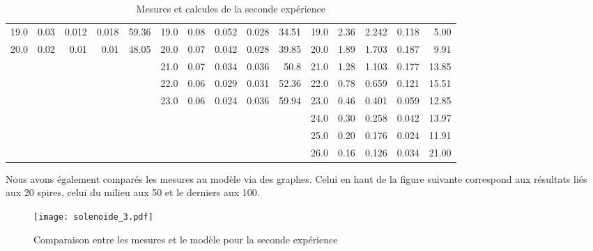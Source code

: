 \begin{table}[H]
{\begin{tabular}{rrrrrrrrrrrrrrr}
   19.0 &  0.03 &       0.012 &          0.018 &          59.36 &   19.0 &  0.08 &       0.052 &          0.028 &          34.51 &    19.0 &  2.36 &       2.242 &          0.118 &           5.00 \\
   20.0 &  0.02 &        0.01 &           0.01 &          48.05 &   20.0 &  0.07 &       0.042 &          0.028 &          39.85 &    20.0 &  1.89 &       1.703 &          0.187 &           9.91 \\
        &       &             &                &                &   21.0 &  0.07 &       0.034 &          0.036 &           50.8 &    21.0 &  1.28 &       1.103 &          0.177 &          13.85 \\
        &       &             &                &                &   22.0 &  0.06 &       0.029 &          0.031 &          52.36 &    22.0 &  0.78 &       0.659 &          0.121 &          15.51 \\
        &       &             &                &                &   23.0 &  0.06 &       0.024 &          0.036 &          59.94 &    23.0 &  0.46 &       0.401 &          0.059 &          12.85 \\
        &       &             &                &                &        &       &             &                &                &    24.0 &  0.30 &       0.258 &          0.042 &          13.97 \\
        &       &             &                &                &        &       &             &                &                &    25.0 &  0.20 &       0.176 &          0.024 &          11.91 \\
        &       &             &                &                &        &       &             &                &                &    26.0 &  0.16 &       0.126 &          0.034 &          21.00 \\
\bottomrule
\end{tabular}}

\caption{Mesures et calcules de la seconde expérience}
\end{table}

Nous avons également comparés les mesures au modèle via des graphes. Celui en haut de la figure suivante correspond aux résultats liés aux 20 spires, celui du milieu aux 50 et le derniers aux 100.

\begin{figure}[H]
\centering
\texttt{[image: solenoide\_3.pdf]}

\caption{Comparaison entre les mesures et le modèle pour la seconde expérience}
\end{figure}